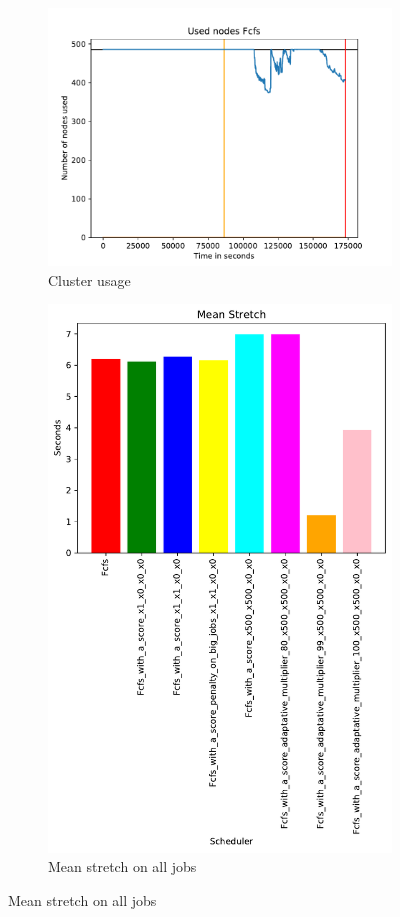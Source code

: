 \documentclass[a4paper]{article}
\begin{document}
\begin{figure}[H]\centering
\begin{subfigure}[b]{0.4\linewidth}\centering\includegraphics[width=0.9\linewidth]{MBSS/plot/2022-01-21->2022-01-21_V9271_Fcfs_Used_nodes_450_128_32_256_4_1024.pdf}\caption{Cluster usage}\end{subfigure}
\begin{subfigure}[b]{0.4\linewidth}\centering\includegraphics[width=0.9\linewidth]{MBSS/plot/Results_FCFS_Score_Adaptative_Multiplier_2022-01-21->2022-01-21_V9271_Mean_Stretch_450_128_32_256_4_1024.pdf}\caption{Mean stretch on all jobs}\end{subfigure}

\end{figure}
\end{document}
